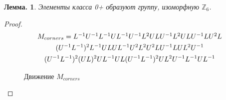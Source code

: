 \documentclass[utf8,russian]{beamer}
\newtheorem{ru_theo}{Лемма.}
\renewenvironment{theorem}{\begin{ru_theo}}{\end{ru_theo}}
\begin{document}
\begin{frame}
	\begin{theorem}
		Элементы класса 0+ образуют группу, изоморфную $\mathbb{Z}_6$.	
	\end{theorem}
	\begin{proof}
		\vspace*{-7mm}
		\begin{multline*}
		$$
		M_{corners}=L^{-1}U^{-1}L^{-1}UL^{-1}U^{-1}L^2ULU^{-1}L^2ULU^{-1}LU^2L \\
		(U^{-1}L^{-1})^2L^{-1}ULUL^{-1}U^2L^2U^2LU^{-1}LUL^2U^{-1} \\
		(U^{-1}L^{-1})^2(UL)^2UL^{-1}UL(U^{-1}L^{-1})^2UL^2U^{-1}L^{-1}UL^{-1}
		$$
		\end{multline*}
		\RubikCubeSolved
		\vspace*{-1cm}
		\begin{figure}[c]
		\caption{Движение $M_{corners}$}
		\end{figure}
		\vspace*{-7mm}
		\end{proof}
\end{frame}
\end{document}

